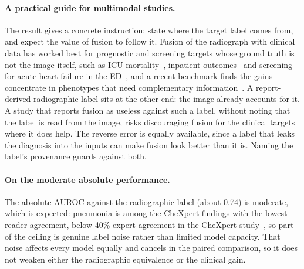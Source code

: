 \documentclass[twocolumn, final]{svjour3}
\begin{document}
\paragraph{A practical guide for multimodal studies.} The result gives a concrete
instruction: state where the target label comes from, and expect the value of fusion to
follow it. Fusion of the radiograph with clinical data has worked best for prognostic and
screening targets whose ground truth is not the image itself, such as ICU
mortality~\citep{hayat2022medfuse}, inpatient outcomes~\citep{soenksen2022multimodal} and
screening for acute heart failure in the ED~\citep{lee2024multimodal}, and a recent benchmark
finds the gains concentrate in phenotypes that need complementary
information~\citep{yin2026multimodal}. A report-derived radiographic label sits at the other
end: the image already accounts for it. A study that reports fusion as useless against such a
label, without noting that the label is read from the image, risks discouraging fusion for
the clinical targets where it does help. The reverse error is equally available, since a
label that leaks the diagnosis into the inputs can make fusion look better than it is. Naming
the label's provenance guards against both.

\paragraph{On the moderate absolute performance.} The absolute AUROC against the radiographic
label (about 0.74) is moderate, which is expected: pneumonia is among the CheXpert findings
with the lowest reader agreement, below 40\% expert agreement in the CheXpert
study~\citep{irvin2019chexpert}, so part of the ceiling is genuine label noise rather than
limited model capacity. That noise affects every model equally and cancels in the paired
comparison, so it does not weaken either the radiographic equivalence or the clinical gain.
\end{document}
